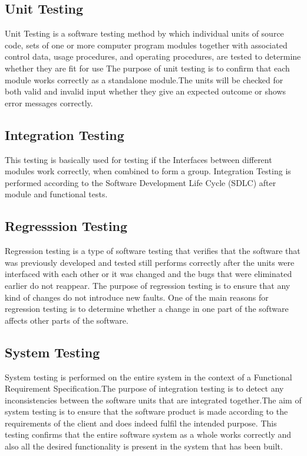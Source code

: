 \documentclass[12pt]{article}
\begin{document}
    \subsection{Unit Testing}
    Unit Testing is a software testing method by which individual units of source code, sets of one or more computer program modules together with associated control data, usage procedures, and operating procedures, are tested to determine whether they are fit for use The purpose of unit testing is to confirm that each module works correctly as a standalone module.The units will be checked for both valid and invalid input whether they give an expected outcome or shows error messages correctly.
    
    \subsection{Integration Testing}
    This testing is basically used for testing if the Interfaces between different modules work correctly, when combined to form a group. Integration Testing is performed according to the Software Development Life Cycle (SDLC) after module and functional tests.
    
    \subsection{Regresssion Testing}
    Regression testing is a type of software testing that verifies that the software that was previously developed and tested still performs correctly after the units were interfaced with each other or it was changed and the bugs that were eliminated earlier do not reappear. The purpose of regression testing is to ensure that any kind of changes do not introduce new faults. One of the main reasons for regression testing is to determine whether a change in one part of the software affects other parts of the software.
    
    \subsection{System Testing}
    System testing is performed on the entire system in the context of a Functional Requirement Specification.The purpose of integration testing is to detect any inconsistencies between the software units that are integrated together.The aim of system testing is to ensure that the software product is made according to the requirements of the client and does indeed fulfil the intended purpose. This testing confirms that the entire software system as a whole works correctly and also all the desired functionality is present in the system that has been built.
    
\end{document}
